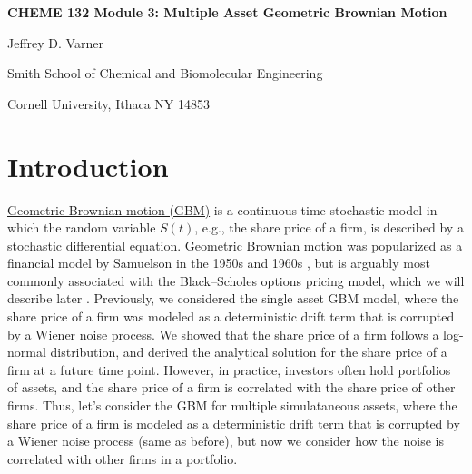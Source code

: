 \documentclass[11pt]{article}
\theoremstyle{definition}
\begin{document}
{\par\centering\textbf{\Large CHEME 132 Module 3: Multiple Asset Geometric Brownian Motion}}
\vspace{0.2in}
{\par \centering \large{Jeffrey D. Varner}}
\vspace{0.05in}
{\par \centering \large{Smith School of Chemical and Biomolecular Engineering}}
{\par \centering \large{Cornell University, Ithaca NY 14853}}

\date{}
\thispagestyle{empty}

\setcounter{page}{1}

\section*{Introduction}
\href{https://en.wikipedia.org/wiki/Geometric_Brownian_motion}{Geometric Brownian motion (GBM)} is a continuous-time stochastic model in which the random variable $S(t)$, 
e.g., the share price of a firm, is described by a stochastic differential equation.
Geometric Brownian motion was popularized as a financial model by Samuelson in the 1950s and 1960s \cite{Merton2006}, 
but is arguably most commonly associated with the Black–Scholes options pricing model, which we will describe later 
\cite{BlackScholes1973}. Previously, we considered the single asset GBM model, 
where the share price of a firm was modeled as a deterministic drift term that is corrupted by a Wiener noise process. 
We showed that the share price of a firm follows a log-normal distribution, and derived the analytical solution for the share price of a firm at a future time point.
However, in practice, investors often hold portfolios of assets, and the share price of a firm is correlated with the share price of other firms.
Thus, let's consider the GBM for multiple simulataneous assets, where the share price of a firm is modeled as a deterministic drift term 
that is corrupted by a Wiener noise process (same as before), but now we consider how the noise is correlated with other firms in a portfolio.
\end{document}
